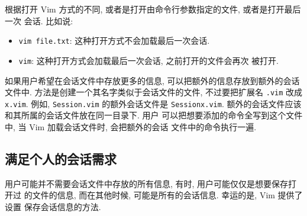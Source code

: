 根据打开 Vim 方式的不同, 或者是打开由命令行参数指定的文件, 或者是打开最后一次
会话. 比如说:
\begin{itemize}
    \item \texttt{vim file.txt}: 这种打开方式不会加载最后一次会话.
    \item \texttt{vim}: 这种打开方式会加载最后一次会话, 之前打开的文件会再次
        被打开.
\end{itemize}

如果用户希望在会话文件中存放更多的信息, 可以把额外的信息存放到额外的会话文件中.
方法是创建一个其名字类似于会话文件的文件, 不过要把扩展名 \texttt{.vim} 改成
\texttt{x.vim}. 例如, \texttt{Session.vim} 的额外会话文件是
\texttt{Sessionx.vim}. 额外的会话文件应该和其所属的会话文件放在同一目录下. 用户
可以把想要添加的命令全写到这个文件中, 当 Vim 加载会话文件时, 会把额外的会话
文件中的命令执行一遍.

\subsection{满足个人的会话需求}
\label{subsec:satify_you_own_session_needs}

用户可能并不需要会话文件中存放的所有信息, 有时, 用户可能仅仅是想要保存打开过
的文件的信息, 而在其他时候, 可能是所有的会话信息. 幸运的是, Vim 提供了设置
保存会话信息的方法.

